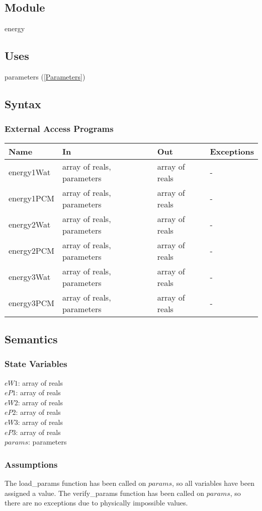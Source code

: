 \documentclass[12pt]{article}
\begin{document}
\subsection{Module}
energy
\subsection{Uses}
parameters (\ref{Parameters})
\subsection{Syntax}
\subsubsection{External Access Programs}
\begin{center}
\begin{tabular}{p{3cm} p{6cm} p{3cm} p{2cm}}
\hline
\textbf{Name} & \textbf{In} & \textbf{Out} & \textbf{Exceptions} \\
\hline
energy1Wat & array of reals, parameters & array of reals & - \\
\hline
energy1PCM & array of reals, parameters & array of reals & - \\
\hline
energy2Wat & array of reals, parameters & array of reals & - \\
\hline
energy2PCM & array of reals, parameters & array of reals & - \\
\hline
energy3Wat & array of reals, parameters & array of reals & - \\
\hline
energy3PCM & array of reals, parameters & array of reals & - \\
\hline
\end{tabular}
\end{center}
\subsection{Semantics}
\subsubsection{State Variables}
$eW1$: array of reals \\
$eP1$: array of reals \\
$eW2$: array of reals \\
$eP2$: array of reals \\
$eW3$: array of reals \\
$eP3$: array of reals \\
$params$: parameters
\subsubsection{Assumptions}
The load\_params function has been called on $params$, so all variables have been assigned a value. The verify\_params function has been called on $params$, so there are no exceptions due to physically impossible values.
\end{document}
